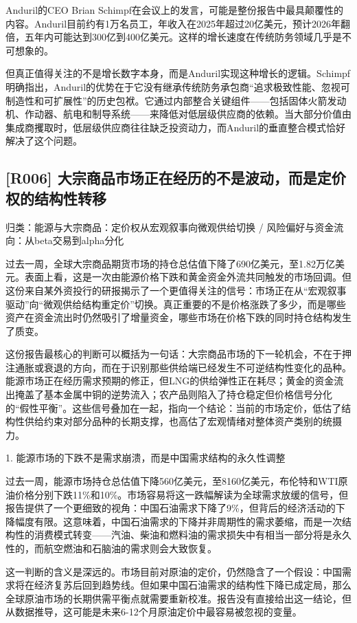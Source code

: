 \documentclass[11pt]{ctexart}
\begin{document}
Anduril的CEO Brian Schimpf在会议上的发言，可能是整份报告中最具颠覆性的内容。Anduril目前约有1万名员工，年收入在2025年超过20亿美元，预计2026年翻倍，五年内可能达到300亿到400亿美元。这样的增长速度在传统防务领域几乎是不可想象的。

但真正值得关注的不是增长数字本身，而是Anduril实现这种增长的逻辑。Schimpf明确指出，Anduril的优势在于它没有继承传统防务承包商“追求极致性能、忽视可制造性和可扩展性”的历史包袱。它通过内部整合关键组件——包括固体火箭发动机、作动器、航电和制导系统——来降低对低层级供应商的依赖。当大部分价值由集成商攫取时，低层级供应商往往缺乏投资动力，而Anduril的垂直整合模式恰好解决了这个问题。

\subsection{[R006] 大宗商品市场正在经历的不是波动，而是定价权的结构性转移}
{\small\color{refgray}归类：能源与大宗商品：定价权从宏观叙事向微观供给切换 / 风险偏好与资金流向：从beta交易到alpha分化}

过去一周，全球大宗商品期货市场的持仓总估值下降了690亿美元，至1.82万亿美元。表面上看，这是一次由能源价格下跌和黄金资金外流共同触发的市场回调。但这份来自某外资投行的研报揭示了一个更值得关注的信号：市场正在从“宏观叙事驱动”向“微观供给结构重定价”切换。真正重要的不是价格涨跌了多少，而是哪些资产在资金流出时仍然吸引了增量资金，哪些市场在价格下跌的同时持仓结构发生了质变。

这份报告最核心的判断可以概括为一句话：大宗商品市场的下一轮机会，不在于押注通胀或衰退的方向，而在于识别那些供给端已经发生不可逆结构性变化的品种。能源市场正在经历需求预期的修正，但LNG的供给弹性正在耗尽；黄金的资金流出掩盖了基本金属中铜的逆势流入；农产品则陷入了持仓稳定但价格信号分化的“假性平衡”。这些信号叠加在一起，指向一个结论：当前的市场定价，低估了结构性供给约束对部分品种的长期支撑，也高估了宏观情绪对整体资产类别的统摄力。

1. 能源市场的下跌不是需求崩溃，而是中国需求结构的永久性调整

过去一周，能源市场持仓总估值下降560亿美元，至8160亿美元，布伦特和WTI原油价格分别下跌11\%和10\%。市场容易将这一跌幅解读为全球需求放缓的信号，但报告提供了一个更细致的视角：中国石油需求下降了9\%，但背后的经济活动的下降幅度有限。这意味着，中国石油需求的下降并非周期性的需求萎缩，而是一次结构性的消费模式转变——汽油、柴油和燃料油的需求损失中有相当一部分将是永久性的，而航空燃油和石脑油的需求则会大致恢复。

这一判断的含义是深远的。市场目前对原油的定价，仍然隐含了一个假设：中国需求将在经济复苏后回到趋势线。但如果中国石油需求的结构性下降已成定局，那么全球原油市场的长期供需平衡点就需要重新校准。报告没有直接给出这一结论，但从数据推导，这可能是未来6-12个月原油定价中最容易被忽视的变量。
\end{document}
